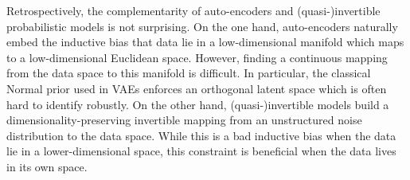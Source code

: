  Retrospectively, the complementarity of auto-encoders and (quasi-)invertible probabilistic models is not surprising. On the one hand, auto-encoders naturally embed the inductive bias that data lie in a low-dimensional manifold which maps to a low-dimensional Euclidean space. However, finding a continuous mapping from the data space to this manifold is difficult. In particular, the classical Normal prior used in VAEs enforces an orthogonal latent space which is often hard to identify robustly. On the other hand, (quasi-)invertible models build a dimensionality-preserving invertible mapping from an unstructured noise distribution to the data space. While this is a bad inductive bias when the data lie in a lower-dimensional space, this constraint is beneficial when the data lives in its own space.

%
